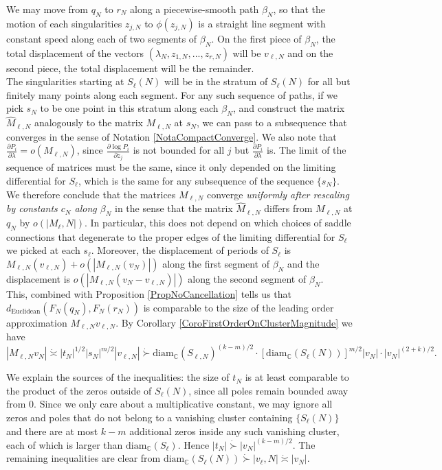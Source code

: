 \documentclass[12pt]{article}
\newcommand{\cc}{\mathbb{C}}
\newcommand{\diam}{\mathrm{diam}}
\begin{document}
\noindent We may move from $q_N$ to $r_N$ along a piecewise-smooth path $\beta_N$, so that the motion of each singularities $z_{j,N}$ to $\phi(z_{j,N})$ is a straight line segment with constant speed along each of two segments of $\beta_N$. On the first piece of $\beta_N$, the total displacement of the vectors $(\lambda_N,z_{1,N},...,z_{r,N})$ will be $v_{\ell,N}$ and on the second piece, the total displacement will be the remainder.\\

\noindent The singularities starting at $S_\ell(N)$ will be in the stratum of $S_\ell(N)$ for all but finitely many points along each segment. For any such sequence of paths, if we pick $s_N$ to be one point in this stratum along each $\beta_N$, and construct the matrix $\hat{M}_{\ell,N}$ analogously to the matrix $M_{\ell,N}$ at $s_N$, we can pass to a subsequence that converges in the sense of Notation \ref{NotaCompactConverge}. We also note that $\frac{\partial P_i}{\partial \lambda} = o(M_{\ell,N})$, since $\frac{\partial \log P_i}{\partial z_j}$ is not bounded for all $j$ but $\frac{\partial P_i}{\partial \lambda}$ is. The limit of the sequence of matrices must be the same, since it only depended on the limiting differential for $S_\ell$, which is the same for any subsequence of the sequence $\{s_N\}$. We therefore conclude that the matrices $M_{\ell,N}$ converge \emph{uniformly after rescaling by constants $c_N$ along $\beta_N$} in the sense that the matrix $\hat{M}_{\ell,N}$ differs from $M_{\ell,N}$ at $q_N$ by $o(|M_\ell,N|)$. In particular, this does not depend on which choices of saddle connections that degenerate to the proper edges of the limiting differential for $S_\ell$ we picked at each $s_\ell$. Moreover, the displacement of periods of $S_\ell$ is $M_{\ell,N}(v_{\ell,N}) + o(|M_{\ell,N}(v_N)|)$ along the first segment of $\beta_N$ and the displacement is $o(|M_{\ell,N}(v_N - v_{\ell,N})|)$ along the second segment of $\beta_N$.\\

\noindent This, combined with Proposition \ref{PropNoCancellation} tells us that $d_\mathrm{Euclidean}(F_N(q_N),F_N(r_N))$ is comparable to the size of the leading order approximation $M_{\ell,N}v_{\ell,N}$. By Corollary \ref{CoroFirstOrderOnClusterMagnitude} we have $$|M_{\ell,N} v_N| \dot{\asymp} |t_N|^{1/2}|s_N|^{m/2}|v_{\ell,N}| \dot{\succ} \diam_\cc(S_{\ell,N})^{(k-m)/2}\cdot[\diam_\cc(S_\ell(N))]^{m/2}|v_N| \cdot |v_N|^{(2+k)/2}.$$

\noindent We explain the sources of the inequalities: the size of $t_N$ is at least comparable to the product of the zeros outside of $S_\ell(N)$, since all poles remain bounded away from $0$. Since we only care about a multiplicative constant, we may ignore all zeros and poles that do not belong to a vanishing cluster containing $\{S_\ell(N)\}$ and there are at most $k-m$ additional zeros inside any such vanishing cluster, each of which is larger than $\diam_\cc(S_\ell).$ Hence $|t_N| \dot{\succ} |v_N|^{(k-m)/2}.$ The remaining inequalities are clear from $\diam_\cc(S_\ell(N)) \dot{\succ} |v_\ell,N| \dot{\asymp} |v_N|.$\\
\end{document}
